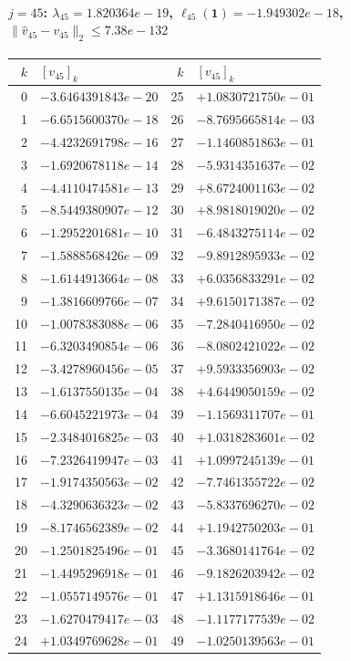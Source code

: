 \documentclass[11pt]{article}
\begin{document}
\paragraph{$j = 45$: $\lambda_{45} = 1.820364e-19$, \quad $\ell_{45}(\mathbf{1}) = -1.949302e-18$, \quad $\|\hat{v}_{45} - v_{45}\|_2 \leq 7.38e-132$}
\begin{center}
{\footnotesize
\begin{tabular}{r@{\;\;}l@{\quad}r@{\;\;}l}
\toprule
$k$ & $[v_{45}]_k$ & $k$ & $[v_{45}]_k$ \\
\midrule
0 & $-3.6464391843e-20$ & 25 & $+1.0830721750e-01$ \\
1 & $-6.6515600370e-18$ & 26 & $-8.7695665814e-03$ \\
2 & $-4.4232691798e-16$ & 27 & $-1.1460851863e-01$ \\
3 & $-1.6920678118e-14$ & 28 & $-5.9314351637e-02$ \\
4 & $-4.4110474581e-13$ & 29 & $+8.6724001163e-02$ \\
5 & $-8.5449380907e-12$ & 30 & $+8.9818019020e-02$ \\
6 & $-1.2952201681e-10$ & 31 & $-6.4843275114e-02$ \\
7 & $-1.5888568426e-09$ & 32 & $-9.8912895933e-02$ \\
8 & $-1.6144913664e-08$ & 33 & $+6.0356833291e-02$ \\
9 & $-1.3816609766e-07$ & 34 & $+9.6150171387e-02$ \\
10 & $-1.0078383088e-06$ & 35 & $-7.2840416950e-02$ \\
11 & $-6.3203490854e-06$ & 36 & $-8.0802421022e-02$ \\
12 & $-3.4278960456e-05$ & 37 & $+9.5933356903e-02$ \\
13 & $-1.6137550135e-04$ & 38 & $+4.6449050159e-02$ \\
14 & $-6.6045221973e-04$ & 39 & $-1.1569311707e-01$ \\
15 & $-2.3484016825e-03$ & 40 & $+1.0318283601e-02$ \\
16 & $-7.2326419947e-03$ & 41 & $+1.0997245139e-01$ \\
17 & $-1.9174350563e-02$ & 42 & $-7.7461355722e-02$ \\
18 & $-4.3290636323e-02$ & 43 & $-5.8337696270e-02$ \\
19 & $-8.1746562389e-02$ & 44 & $+1.1942750203e-01$ \\
20 & $-1.2501825496e-01$ & 45 & $-3.3680141764e-02$ \\
21 & $-1.4495296918e-01$ & 46 & $-9.1826203942e-02$ \\
22 & $-1.0557149576e-01$ & 47 & $+1.1315918646e-01$ \\
23 & $-1.6270479417e-03$ & 48 & $-1.1177177539e-02$ \\
24 & $+1.0349769628e-01$ & 49 & $-1.0250139563e-01$ \\
\bottomrule
\end{tabular}
}
\end{center}
\end{document}
